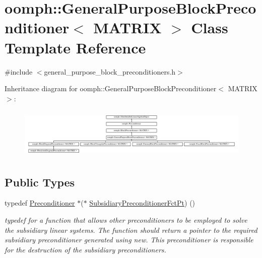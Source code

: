 \hypertarget{classoomph_1_1GeneralPurposeBlockPreconditioner}{}\section{oomph\+:\+:General\+Purpose\+Block\+Preconditioner$<$ M\+A\+T\+R\+IX $>$ Class Template Reference}
\label{classoomph_1_1GeneralPurposeBlockPreconditioner}


{\ttfamily \#include $<$general\+\_\+purpose\+\_\+block\+\_\+preconditioners.\+h$>$}

Inheritance diagram for oomph\+:\+:General\+Purpose\+Block\+Preconditioner$<$ M\+A\+T\+R\+IX $>$\+:\begin{figure}[H]
\begin{center}
\leavevmode
\includegraphics[height=2.470588cm]{classoomph_1_1GeneralPurposeBlockPreconditioner}
\end{center}
\end{figure}
\subsection*{Public Types}
\begin{DoxyCompactItemize}
\item 
typedef \hyperlink{classoomph_1_1Preconditioner}{Preconditioner} $\ast$($\ast$ \hyperlink{classoomph_1_1GeneralPurposeBlockPreconditioner_a4818c6bde7206cd9b5df4f8c1e3a3c34}{Subsidiary\+Preconditioner\+Fct\+Pt}) ()
\begin{DoxyCompactList}\small\item\em typedef for a function that allows other preconditioners to be employed to solve the subsidiary linear systems. The function should return a pointer to the required subsidiary preconditioner generated using new. This preconditioner is responsible for the destruction of the subsidiary preconditioners. \end{DoxyCompactList}\end{DoxyCompactItemize}
